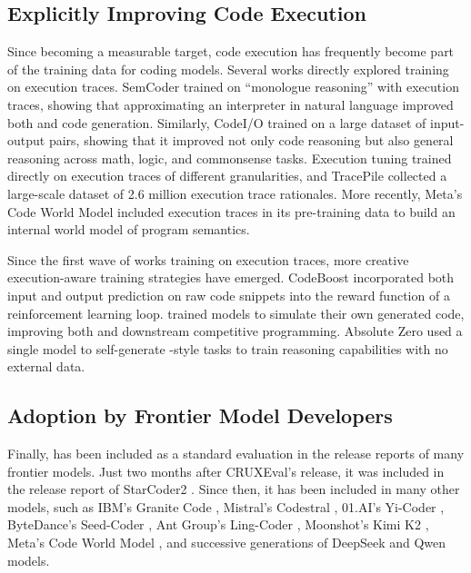 \subsection{Explicitly Improving Code Execution} \label{sec:cruxeval-execution-impact}
Since becoming a measurable target, code execution has frequently become
part of the training data for coding models. Several works directly explored
training on execution traces. SemCoder \citep{ding2024semcoder} trained on ``monologue
reasoning'' with execution traces, showing that approximating an interpreter in
natural language improved both \benchmark{} and code generation. Similarly, CodeI/O \citep{li2025codeio}
trained on a large dataset of input-output pairs, showing that it improved not only code
reasoning but also general reasoning across math, logic, and commonsense tasks.
Execution tuning \citep{armengolestape2025execution} trained directly on
execution traces of different granularities, and TracePile \citep{chen2025tracepile}
collected a large-scale dataset of 2.6 million execution trace rationales.
More recently, Meta's Code World Model \citep{faircodegen2025cwm} included execution traces
in its pre-training data to build an internal world model of program semantics.

Since the first wave of works training on execution traces, more creative execution-aware training strategies
have emerged. CodeBoost \citep{wang2025codeboost} incorporated both input and output
prediction on raw code snippets into the reward function of a reinforcement learning loop.
\citet{maimon2026selfexecution} trained models to simulate their own generated
code, improving both \benchmark{} and downstream competitive programming.
Absolute Zero \citep{zhao2025absolutezero} used a single model to self-generate \benchmark{}-style
tasks to train reasoning capabilities with no external data.

\subsection{Adoption by Frontier Model Developers}
Finally, \benchmark{} has been included as a standard evaluation in the release reports of
many frontier models. Just two months after CRUXEval's release, it was included in the
release report of StarCoder2 \citep{lozhkov2024starcoder}. Since then, it has been
included in many other models, such as IBM's Granite Code
\citep{mishra2024granite}, Mistral's Codestral \citep{mistral2024codestral},
01.AI's Yi-Coder \citep{yi2024yicoder}, ByteDance's Seed-Coder
\citep{bytedance2025seedcoder}, Ant Group's Ling-Coder
\citep{codefuse2025lingcoderlite}, Moonshot's Kimi K2
\citep{moonshotai2025kimik2}, Meta's Code World Model
\citep{faircodegen2025cwm}, and successive generations of DeepSeek
\citep{deepseekai2024deepseekv2, deepseekai2024deepseekcoderv2,
deepseekai2024deepseekv3} and Qwen \citep{qwen2024qwen25coder,
qwen2025qwen3technical} models.

